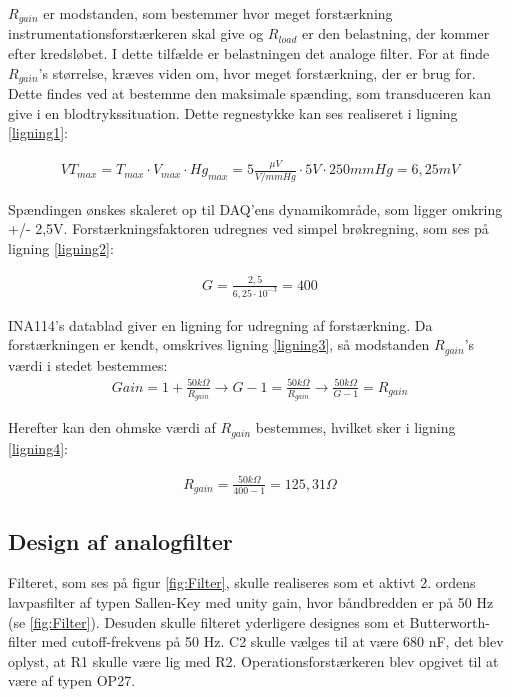 $R_{gain}$ er modstanden, som bestemmer hvor meget forstærkning instrumentationsforstærkeren skal give og $R_{load}$ er den belastning, der kommer efter kredsløbet. I dette tilfælde er belastningen det analoge filter. For at finde $R_{gain}$’s størrelse, kræves viden om, hvor meget forstærkning, der er brug for. Dette findes ved at bestemme den maksimale spænding, som transduceren kan give i en blodtrykssituation. Dette regnestykke kan ses realiseret i ligning \ref{ligning1}:

\begin{align}
	VT_{max}=T_{max}\cdot V_{max}\cdot Hg_{max}=5\frac{\mu V}{V/mmHg}\cdot 5V\cdot 250mmHg=6,25mV
	\label{ligning1}
\end{align}

Spændingen ønskes skaleret op til DAQ’ens dynamikområde, som ligger omkring +/- 2,5V. Forstærkningsfaktoren udregnes ved simpel brøkregning, som ses på ligning \ref{ligning2}:

\begin{center}
	\begin{align}
		G=\frac{2,5}{6,25 \cdot 10^{-3}}=400
		\label{ligning2}
	\end{align}
\end{center}

INA114’s datablad giver en ligning for udregning af forstærkning. Da forstærkningen er kendt, omskrives ligning \ref{ligning3}, så modstanden $R_{gain}$’s værdi i stedet bestemmes:\\


\begin{align}
	Gain=1+\frac{50k\Omega}{R_{gain}}\to G-1=\frac{50k\Omega}{R_{gain}}\to \frac{50k\Omega}{G-1}=R_{gain}
	\label{ligning3}
\end{align}

Herefter kan den ohmske værdi af $R_{gain}$ bestemmes, hvilket sker i ligning \ref{ligning4}:

\begin{align}
	R_{gain}=\frac{50k\Omega}{400-1}=125,31 \Omega
	\label{ligning4}
\end{align}

\subsection{Design af analogfilter}
Filteret, som ses på figur \ref{fig:Filter}, skulle realiseres som et aktivt 2. ordens lavpasfilter af typen Sallen-Key med unity gain, hvor båndbredden er på 50 Hz (se \ref{fig:Filter}). Desuden skulle filteret yderligere designes som et Butterworth-filter med cutoff-frekvens på 50 Hz. C2 skulle vælges til at være 680 nF, det blev oplyst, at R1 skulle være lig med R2. Operationsforstærkeren blev opgivet til at være af typen OP27.  

